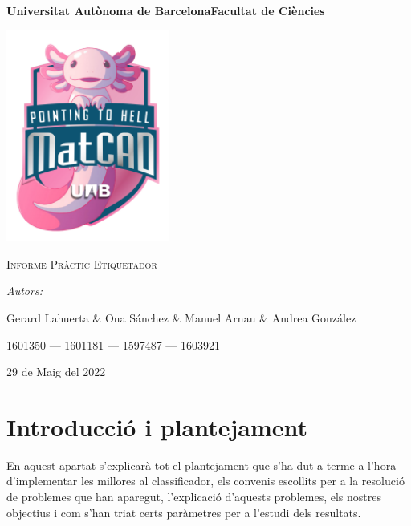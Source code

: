\documentclass[a4paper, 11pt]{article}
\begin{document}
\begin{titlepage}
    \centering
    {\bfseries\LARGE \hspace{1.9em} Universitat Autònoma de Barcelona\newline Facultat de Ciències\par}
    \vspace{2cm}
    {\hspace{-1em}\includegraphics[width=0.4\textwidth]{logo.png}\par}
    \vspace{1cm}
    {\scshape\Huge Informe Pràctic Etiquetador\par} 
    \vspace{1cm}
    {\Large \itshape Autors: \par}
    {\Large \hspace{0.7em}Gerard Lahuerta \& Ona Sánchez \& Manuel Arnau \& Andrea González\par}
    {\Large 1601350 --- 1601181 --- 1597487 --- 1603921\par}
    
    \vspace{1cm}
    {\Large 29 de Maig del 2022\par}
\end{titlepage}

\justifying

\newpage
\setcounter{page}{2}
\pagestyle{plain}
\tableofcontents
\cleardoublepage
{}
\newpage

\section{Introducció i plantejament}
En aquest apartat s'explicarà tot el plantejament que s'ha dut a terme a l'hora d'implementar les millores al classificador, els convenis escollits per a la resolució de problemes que han aparegut, l'explicació d'aquests problemes, els nostres objectius i com s'han triat certs paràmetres per a l'estudi dels resultats.
\end{document}
